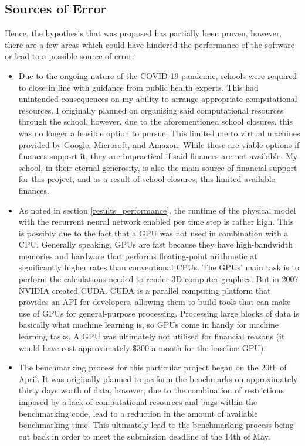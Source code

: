 \subsection{Sources of Error}

Hence, the hypothesis that was proposed has partially been proven, however, there are a few areas which could have hindered the performance of the software or lead to a possible source of error:

\begin{itemize}
    \item Due to the ongoing nature of the COVID-19 pandemic, schools were required to close in line with guidance from public health experts. This had unintended consequences on my ability to arrange appropriate computational resources. I originally planned on organising said computational resources through the school, however, due to the aforementioned school closures, this was no longer a feasible option to pursue. This limited me to virtual machines provided by Google, Microsoft, and Amazon. While these are viable options if finances support it, they are impractical if said finances are not available. My school, in their eternal generosity, is also the main source of financial support for this project, and as a result of school closures, this limited available finances.
    \item As noted in section \ref{results_performance}, the runtime of the physical model with the recurrent neural network enabled per time step is rather high. This is possibly due to the fact that a GPU was not used in combination with a CPU. Generally speaking, GPUs are fast because they have high-bandwidth memories and hardware that performs floating-point arithmetic at significantly higher rates than conventional CPUs. The GPUs' main task is to perform the calculations needed to render 3D computer graphics. But in 2007 NVIDIA created CUDA. CUDA is a parallel computing platform that provides an API for developers, allowing them to build tools that can make use of GPUs for general-purpose processing. Processing large blocks of data is basically what machine learning is, so GPUs come in handy for machine learning tasks\cite{gpus}. A GPU was ultimately not utilised for financial reasons (it would have cost approximately \$300 a month for the baseline GPU).
    \item The benchmarking process for this particular project began on the 20th of April. It was originally planned to perform the benchmarks on approximately thirty days worth of data, however, due to the combination of restrictions imposed by a lack of computational resources and bugs within the benchmarking code, lead to a reduction in the amount of available benchmarking time. This ultimately lead to the benchmarking process being cut back in order to meet the submission deadline of the 14th of May.   
\end{itemize}

